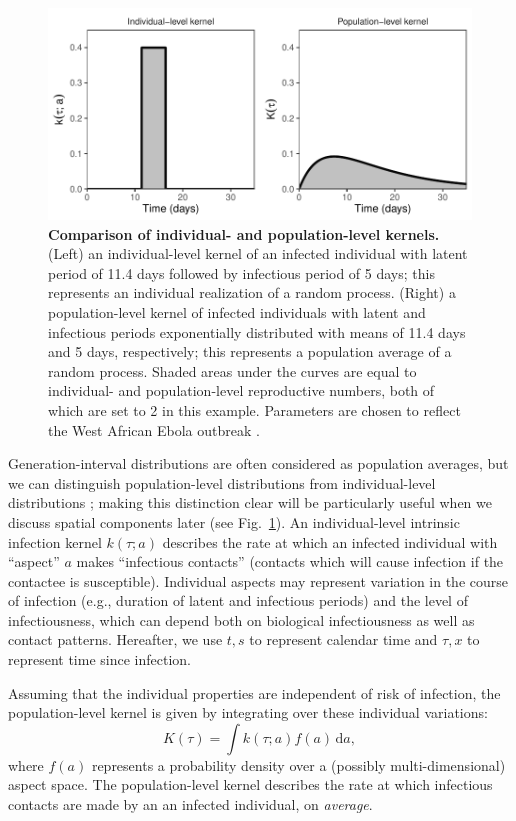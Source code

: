 \documentclass[12pt]{article}
\newcommand{\fref}[1]{Fig.~\ref{fig:#1}}
\begin{document}
\begin{figure}[!ht]
\includegraphics[width=\textwidth]{individual_and_population.pdf}
\caption{\textbf{Comparison of individual- and population-level kernels.}
(Left) an individual-level kernel of an infected individual with latent period of 11.4 days followed by infectious period of 5 days;
this represents an individual realization of a random process.
(Right) a population-level kernel of infected individuals with latent and infectious periods exponentially distributed with means of 11.4 days and 5 days, respectively;
this represents a population average of a random process.
Shaded areas under the curves are equal to individual- and population-level reproductive numbers, both of which are set to 2 in this example.
Parameters are chosen to reflect the West African Ebola outbreak \citep{who2014ebola}.}
\label{fig:indpop}
\end{figure}

Generation-interval distributions are often considered as population averages, but we can distinguish population-level distributions from individual-level distributions \citep{svensson2007note, svensson2015influence}; 
making this distinction clear will be particularly useful when we discuss spatial components later (see \fref{indpop}).
An individual-level intrinsic infection kernel $k(\tau; a)$ describes the rate at which an infected individual with ``aspect'' $a$ makes ``infectious contacts'' (contacts which will cause infection if the contactee is susceptible).
Individual aspects may represent variation in the course of infection (e.g., duration of latent and infectious periods) and the level of infectiousness, which can depend both on biological infectiousness as well as contact patterns.
Hereafter, we use $t, s$ to represent calendar time and $\tau, x$ to
represent time since infection.

Assuming that the individual properties are independent of risk of infection, the population-level kernel is given by integrating over these individual variations:
\begin{equation}
K(\tau) = \int k (\tau; a) f(a) \,\mathrm{d}a,
\end{equation}
where $f(a)$ represents a probability density over a (possibly multi-dimensional) aspect space.
The population-level kernel describes the rate at which infectious contacts are made by an an infected individual, on \emph{average}.
\end{document}
